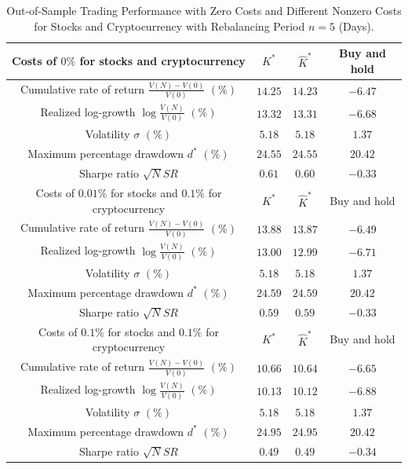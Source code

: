 \documentclass[10pt]{article} %
\begin{document}
	\begin{table}[h!] 
		\centering
		\caption{Out-of-Sample Trading Performance  with Zero Costs and Different Nonzero Costs for Stocks and
			Cryptocurrency with Rebalancing Period $n=5$ (Days).} 
		\begin{tabular}{|c|c|c|c|}
			\hline
			Costs of $0\%$ for stocks and cryptocurrency & $K^*$ & $\widehat{K}^*$ & Buy and hold \\
			\hline
			Cumulative rate of return $\frac{V(N)-V(0)}{V(0)}$ $(\%)$ & $14.25$ & $14.23$ & $-6.47$ \\
			\hline
			Realized log-growth $\log\frac{V(N)}{V(0)}$ $(\%)$ & $13.32$ & $13.31$ & $-6.68$\\
			\hline
			Volatility $\sigma$ $(\%)$ & $5.18$ & $5.18$ & $1.37$\\
			\hline
			Maximum percentage drawdown $d^*$ $(\%)$ & $24.55$ & $24.55$ & $20.42$ \\
			\hline
			Sharpe ratio $\sqrt{N}SR$ &  $0.61$ &  $0.60$ &  $-0.33$ \\
			\hline
			\hline
			\hline
			Costs of $0.01\%$ for stocks and $0.1\%$ for cryptocurrency & $K^*$ & $\widehat{K}^*$ & Buy and hold \\
			\hline
			Cumulative rate of return $\frac{V(N)-V(0)}{V(0)}$ $(\%)$ & $13.88$ & $13.87$ & $-6.49$ \\
			\hline
			Realized log-growth $\log\frac{V(N)}{V(0)}$ $(\%)$ & $13.00$ & $12.99$ & $-6.71$\\
			\hline
			Volatility $\sigma$ $(\%)$ & $5.18$ & $5.18$ & $1.37$\\
			\hline
			Maximum percentage drawdown $d^*$ $(\%)$ & $24.59$ & $24.59$ & $20.42$ \\
			\hline
			Sharpe ratio $\sqrt{N}SR$ &  $0.59$ &  $0.59$ &  $-0.33$ \\
			\hline
			\hline
			\hline
			Costs of $0.1\%$ for stocks and $0.1\%$ for cryptocurrency & $K^*$ & $\widehat{K}^*$ & Buy and hold \\
			\hline
			Cumulative rate of return $\frac{V(N)-V(0)}{V(0)}$ $(\%)$ & $10.66$ & $10.64$ & $-6.65$ \\
			\hline
			Realized log-growth $\log\frac{V(N)}{V(0)}$ $(\%)$ & $10.13$ & $10.12$ & $-6.88$ \\
			\hline
			Volatility $\sigma$ $(\%)$ & $5.18$ & $5.18$ & $1.37$ \\
			\hline
			Maximum percentage drawdown $d^*$ $(\%)$ & $24.95$ & $24.95$ & $20.42$ \\
			\hline
			Sharpe ratio $\sqrt{N}SR$ &  $0.49$ &  $0.49$ &  $-0.34$ \\

\end{tabular}
\end{table}
\end{document}
